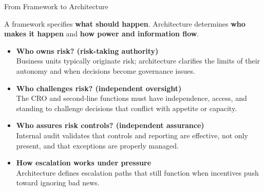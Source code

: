 \documentclass[aspectratio=169, 10pt]{beamer} %
\begin{document}
\begin{frame}{From Framework to Architecture}

A framework specifies \textbf{what should happen}.  
Architecture determines \textbf{who makes it happen} and \textbf{how power and information flow}.

\medskip

\begin{itemize}
  \item[$\bullet$] \textbf{Who owns risk? (risk-taking authority)}\\
  Business units typically originate risk; architecture clarifies the limits of
  their autonomy and when decisions become governance issues.

  \item[$\bullet$] \textbf{Who challenges risk? (independent oversight)}\\
  The CRO and second-line functions must have independence, access, and standing
  to challenge decisions that conflict with appetite or capacity.

  \item[$\bullet$] \textbf{Who assures risk controls? (independent assurance)}\\
  Internal audit validates that controls and reporting are effective, not only
  present, and that exceptions are properly managed.

  \item[$\bullet$] \textbf{How escalation works under pressure}\\
  Architecture defines escalation paths that still function when incentives
  push toward ignoring bad news.
\end{itemize}

\end{frame}
\end{document}
